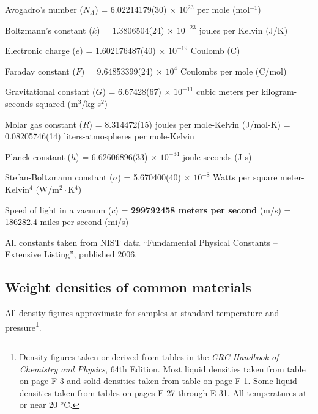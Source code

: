 \noindent 
Avogadro's number ($N_A$) = 6.02214179(30) $\times$ $10^{23}$ per mole (mol$^{-1}$)

\vskip 5pt

\noindent
Boltzmann's constant ($k$) = 1.3806504(24) $\times$ $10^{-23}$ joules per Kelvin (J/K)

\vskip 5pt

\noindent
Electronic charge ($e$) = 1.602176487(40) $\times$ $10^{-19}$ Coulomb (C)

\vskip 5pt

\noindent
Faraday constant ($F$) = 9.64853399(24) $\times$ $10^{4}$ Coulombs per mole (C/mol)

\vskip 5pt

\noindent
Gravitational constant ($G$) = 6.67428(67) $\times$ $10^{-11}$ cubic meters per kilogram-seconds squared (m$^{3}$/kg-s$^{2}$)

\vskip 5pt

\noindent 
Molar gas constant ($R$) = 8.314472(15) joules per mole-Kelvin (J/mol-K) = 0.08205746(14) liters-atmospheres per mole-Kelvin

\vskip 5pt

\noindent 
Planck constant ($h$) = 6.62606896(33) $\times$ $10^{-34}$ joule-seconds (J-s)

\vskip 5pt

\noindent
Stefan-Boltzmann constant ($\sigma$) = 5.670400(40) $\times$ $10^{-8}$ Watts per square meter-Kelvin$^{4}$ (W/m$^{2} \cdot$K$^{4}$)

\vskip 5pt

\noindent 
Speed of light in a vacuum ($c$) = \textbf{299792458 meters per second} (m/s) = 186282.4 miles per second (mi/s)

\vskip 10pt

\noindent
All constants taken from NIST data ``Fundamental Physical Constants -- Extensive Listing'', published 2006.







\filbreak
\subsection{Weight densities of common materials}

All density figures approximate for samples at standard temperature and pressure\footnote{Density figures taken or derived from tables in the \textit{CRC Handbook of Chemistry and Physics}, 64th Edition.  Most liquid densities taken from table on page F-3 and solid densities taken from table on page F-1.  Some liquid densities taken from tables on pages E-27 through E-31.  All temperatures at or near 20 $^{o}$C.}.

